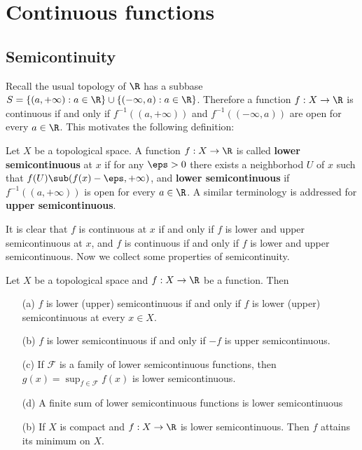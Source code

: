 \section{Continuous functions}
\subsection{Semicontinuity}
Recall the usual topology of $\R$ has a subbase $S=\{(a,+\infty):a\in\R\}\cup\{(-\infty,a):a\in\R\}$. Therefore a function $f:X\to\R$ is continuous if and only if $f^{-1}((a,+\infty))$ and $f^{-1}((-\infty,a))$ are open for every $a\in\R$. This motivates the following definition:
\begin{definition}
Let $X$ be a topological space. A function $f:X\to\R$ is called \textbf{lower semicontinuous} at $x$ if for any $\eps>0$ there exists a neighborhod $U$ of $x$ such that $f(U)\sub (f(x)-\eps,+\infty)$, and \textbf{lower semicontinuous} if $f^{-1}((a,+\infty))$ is open for every $a\in\R$. A similar terminology is addressed for \textbf{upper semicontinuous}.
\end{definition}
It is clear that $f$ is continuous at $x$ if and only if $f$ is lower and upper semicontinuous at $x$, and $f$ is continuous if and only if $f$ is lower and upper semicontinuous. Now we collect some properties of semicontinuity.
\begin{proposition}\label{lower semicontinuous prop}
Let $X$ be a topological space and $f:X\to\R$ be a function. Then
\begin{itemize}
\item[(a)] $f$ is lower (upper) semicontinuous if and only if $f$ is lower (upper) semicontinuous at every $x\in X$.
\item[(b)] $f$ is lower semicontinuous if and only if $-f$ is upper semicontinuous.
\item[(c)] If $\mathscr{F}$ is a family of lower semicontinuous functions, then $g(x)=\sup_{f\in\mathscr{F}}f(x)$ is lower semicontinuous.
\item[(d)] A finite sum of lower semicontinuous functions is lower semicontinuous  
\item[(b)] If $X$ is compact and $f:X\to\R$ is lower semicontinuous. Then $f$ attains its minimum on $X$.
\end{itemize}
\end{proposition}
